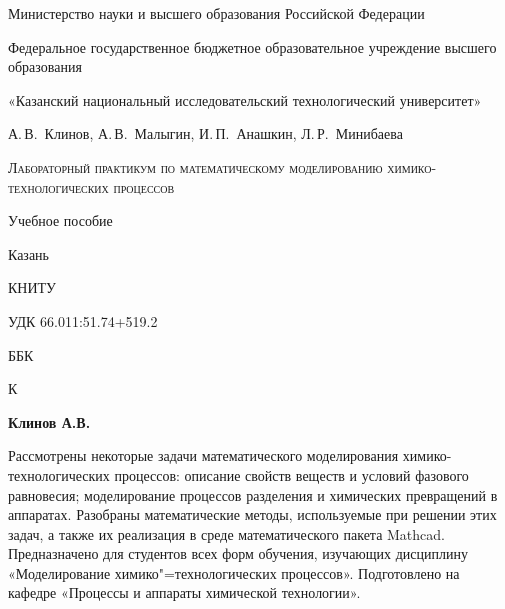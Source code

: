 \begin{center}
	
Министерство науки и высшего образования Российской Федерации

Федеральное государственное бюджетное образовательное учреждение высшего образования

«Казанский национальный исследовательский технологический университет»
\vspace{3 cm}

А.\,В.~Клинов, А.\,В.~Малыгин, И.\,П.~Анашкин, Л.\,Р.~Минибаева
\vspace{3 cm}

\textsc{Лабораторный практикум по математическому моделированию химико-технологических процессов}
\vspace{1 cm}

Учебное пособие
\vspace{4 cm}

Казань

КНИТУ

\number\year
\end{center}
\thispagestyle{empty}
\newpage

УДК 66.011:51.74+519.2

ББК 

К 

\textbf{Клинов А.В.}


Рассмотрены некоторые задачи математического моделирования химико-технологических процессов: описание свойств веществ и условий фазового равновесия; моделирование процессов разделения и химических превращений в аппаратах. Разобраны математические методы, используемые при решении этих задач, а также их реализация в среде математического пакета Mathcad. 
Предназначено для студентов всех форм обучения, изучающих дисциплину «Моделирование химико"=технологических процессов».
Подготовлено на кафедре «Процессы и аппараты химической технологии».


\thispagestyle{empty}
\newpage
\tableofcontents
\newpage